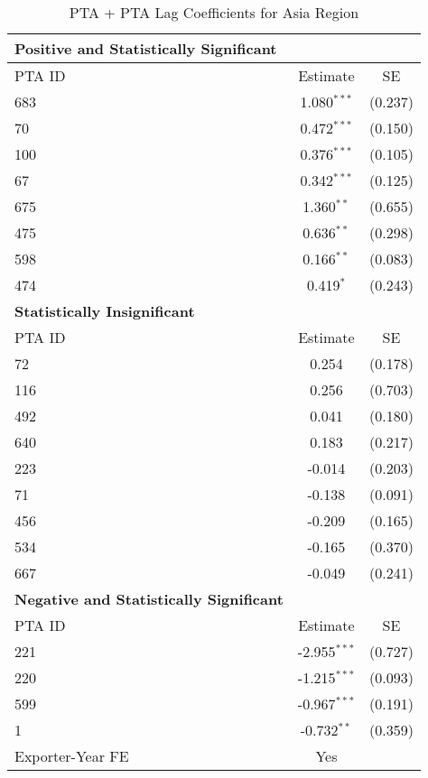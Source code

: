 \begin{table}[htbp]
    \centering
    \caption{PTA + PTA Lag Coefficients for Asia Region}
    \label{tab:pta_asia}
    \begin{adjustbox}{max width=\textwidth}
    \begin{tabular}{lcc}
    \hline
    \textbf{Positive and Statistically Significant} &  &  \\
    \hline
    PTA ID & Estimate & SE \\
    \hline
    683 & 1.080$^{\ast\ast\ast}$ & (0.237) \\
    70  & 0.472$^{\ast\ast\ast}$ & (0.150) \\
    100 & 0.376$^{\ast\ast\ast}$ & (0.105) \\
    67  & 0.342$^{\ast\ast\ast}$ & (0.125) \\
    675 & 1.360$^{\ast\ast}$ & (0.655) \\
    475 & 0.636$^{\ast\ast}$ & (0.298) \\
    598 & 0.166$^{\ast\ast}$ & (0.083) \\
    474 & 0.419$^{\ast}$ & (0.243) \\
    \hline
    \textbf{Statistically Insignificant} &  &  \\
    \hline
    PTA ID & Estimate & SE \\
    \hline
    72  & 0.254 & (0.178) \\
    116 & 0.256 & (0.703) \\
    492 & 0.041 & (0.180) \\
    640 & 0.183 & (0.217) \\
    223 & -0.014 & (0.203) \\
    71  & -0.138 & (0.091) \\
    456 & -0.209 & (0.165) \\
    534 & -0.165 & (0.370) \\
    667 & -0.049 & (0.241) \\
    \hline
    \textbf{Negative and Statistically Significant} &  &  \\
    \hline
    PTA ID & Estimate & SE \\
    \hline
    221 & -2.955$^{\ast\ast\ast}$ & (0.727) \\
    220 & -1.215$^{\ast\ast\ast}$ & (0.093) \\
    599 & -0.967$^{\ast\ast\ast}$ & (0.191) \\
    1   & -0.732$^{\ast\ast}$ & (0.359) \\
    \hline
    Exporter-Year FE & Yes \\

\end{tabular}
\end{adjustbox}
\end{table}
